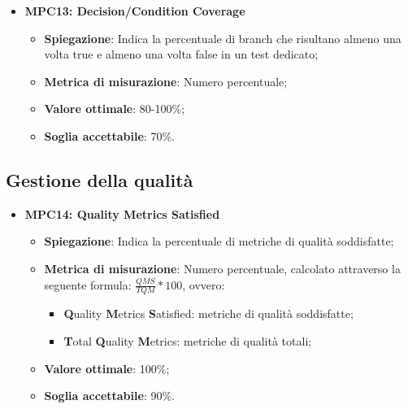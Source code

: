 \begin{itemize}
    \item \textbf{MPC13: Decision/Condition Coverage}
    \begin{itemize}
        \item \textbf{Spiegazione}: Indica la percentuale di branch che risultano almeno una volta true e almeno una volta false in un test dedicato;
        \item \textbf{Metrica di misurazione}: Numero percentuale;
        \item \textbf{Valore ottimale}: 80-100\%;
        \item \textbf{Soglia accettabile}: 70\%.
    \end{itemize}
\end{itemize}

\subsection{Gestione della qualità}
\begin{itemize}
    \item \textbf{MPC14: Quality Metrics Satisfied}
    \begin{itemize}
        \item \textbf{Spiegazione}: Indica la percentuale di metriche di qualità soddisfatte;
        \item \textbf{Metrica di misurazione}: Numero percentuale, calcolato attraverso la seguente formula: \textbf{$\frac{QMS}{TQM}*100$}, ovvero:
            \begin{itemize}
                \item \textbf{Q}uality \textbf{M}etrics \textbf{S}atisfied: metriche di qualità soddisfatte;
                \item \textbf{T}otal \textbf{Q}uality \textbf{M}etrics: metriche di qualità totali;
            \end{itemize}
        \item \textbf{Valore ottimale}: 100\%;
        \item \textbf{Soglia accettabile}: 90\%.
    \end{itemize}
\end{itemize}

